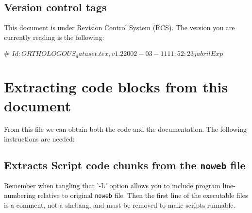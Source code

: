 \documentclass[11pt]{article}
\def\nwendcode{\endtrivlist \endgroup} %
\let\nwdocspar=\par                    %
\newcommand{\sctn}[1]{\section{#1}}
\newcommand{\subsctn}[1]{\subsection{#1}}
\begin{document}
\subsctn{Version control tags}

This document is under Revision Control System (RCS). The version you are currently reading is the following:

\nwenddocs{}\endmoddef
# $Id: ORTHOLOGOUS_dataset.tex,v 1.2 2002-03-11 11:52:23 jabril Exp $
\nwendcode{}\nwdocspar

\newpage

\sctn{Extracting code blocks from this document}

From this file we can obtain both the code and the
documentation. The following instructions are needed:

\subsctn{Extracts Script code chunks from the {\tt{}noweb} file} %

Remember when tangling that '-L' option allows you to include program line-numbering relative to original {\tt{}noweb} file. Then the first line of the executable files is a comment, not a shebang, and must be removed to make scripts runnable.
\end{document}
